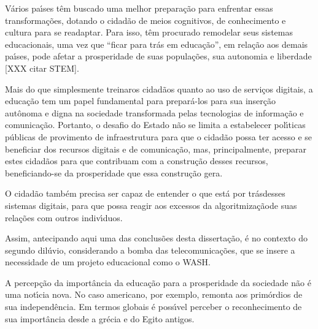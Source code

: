 \documentclass[
12pt,		%
openright,	%
twoside,  %
a4paper,			%
chapter=TITLE,		%
english,			%
french,				%
spanish,			%
brazil				%
]{USPSC-classe/USPSC}
\begin{document}
V\'arios pa\'{\i}ses t\^em buscado uma melhor prepara\c{c}\~ao para enfrentar essas transforma\c{c}\~oes, dotando o cidad\~ao de meios cognitivos, de conhecimento e cultura para se readaptar. Para isso, t\^em procurado remodelar seus sistemas educacionais, uma vez que “ficar para tr\'as em educa\c{c}\~ao”, em rela\c{c}\~ao aos demais pa\'{\i}ses, pode afetar a prosperidade de suas popula\c{c}\~oes, sua autonomia e liberdade [XXX citar STEM].










Mais do que simplesmente \textquotedbl treinar\textquotedbl  os cidad\~aos quanto ao uso  de servi\c{c}os digitais, a educa\c{c}\~ao tem um papel fundamental para prepar\'a-los para sua inser\c{c}\~ao aut\^onoma e digna na sociedade transformada pelas tecnologias de informa\c{c}\~ao e comunica\c{c}\~ao. Portanto, o desafio do Estado n\~ao se limita a estabelecer pol\'{\i}ticas p\'ublicas de provimento de infraestrutura para que o cidad\~ao possa ter acesso e se beneficiar dos recursos digitais e de comunica\c{c}\~ao, mas, principalmente, preparar estes cidad\~aos para que contribuam com a  constru\c{c}\~ao desses recursos, beneficiando-se da prosperidade que  essa constru\c{c}\~ao gera.










O cidad\~ao tamb\'em precisa ser capaz de entender \textquotedbl o que est\'a por tr\'as\textquotedbl  desses sistemas digitais, para que possa reagir aos excessos da \textquotedbl algoritmiza\c{c}\~ao\textquotedbl  de suas rela\c{c}\~oes com outros indiv\'{\i}duos.










Assim, antecipando aqui uma das conclus\~oes desta disserta\c{c}\~ao, \'e no contexto do \textquotedbl segundo dil\'uvio\textquotedbl , considerando a bomba das telecomunica\c{c}\~oes, que se insere a necessidade de um projeto educacional como o WASH.










A percep\c{c}\~ao da import\^ancia da educa\c{c}\~ao para a prosperidade da sociedade n\~ao \'e uma not\'{\i}cia nova. No caso americano, por exemplo, remonta aos prim\'ordios de sua independ\^encia. Em termos globais \'e poss\'{\i}vel perceber o reconhecimento de sua import\^ancia desde a gr\'ecia e do Egito antigos.
\end{document}
